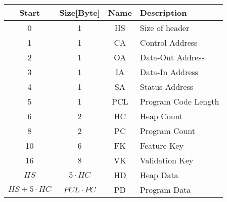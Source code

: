	\begin{tabular}{c|c|c|l}
		\textbf{Start} & \textbf{Size[Byte]} & \textbf{Name} & \textbf{Description} \\ \hline
		0 & 1 & HS & Size of header\\ 
		1 & 1 & CA & Control Address \\ 
		2 & 1 & OA & Data-Out Address \\ 
		3 & 1 & IA & Data-In Address \\ 
		4 & 1 & SA & Status Address \\ 
		5 & 1 & PCL & Program Code Length \\ 
		6 & 2 & HC & Heap Count \\ 
		8 & 2 & PC & Program Count \\ 
		10 & 6 & FK & Feature Key \\ 
		16 & 8 & VK & Validation Key \\
		$HS$ & $5 \cdot HC$ & HD & Heap Data \\
		$HS + 5 \cdot HC$ & $PCL \cdot PC$ & PD & Program Data \\
		
	\end{tabular}